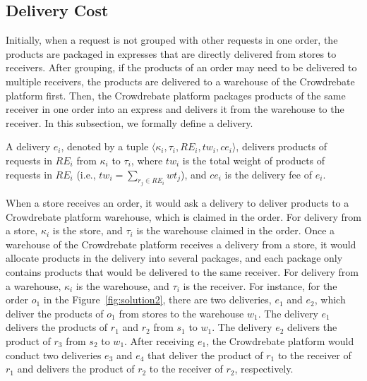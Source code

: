 \subsection{Delivery Cost}
\label{subsec:express}

Initially, when a request is not grouped with other requests in one order, the products are packaged in expresses that are directly delivered from stores to receivers. After grouping, if the products of an order may need to be delivered to multiple receivers, the products are delivered to a warehouse of the Crowdrebate platform first. Then, the Crowdrebate platform packages products of the same receiver in one order into an express and delivers it from the warehouse to the receiver. In this subsection, we formally define a delivery.

\begin{definition}
	\label{def:delivery}
	A delivery $e_i$, denoted by a tuple $\langle \kappa_i, \tau_i, RE_i, tw_i, ce_i\rangle$, delivers products of requests in $RE_i$ from $\kappa_i$ to $\tau_i$, where $tw_i$ is the total weight of products of requests in $RE_i$ (i.e., $tw_i = \sum\limits_{r_j \in RE_i} wt_j$), and $ce_i$ is the delivery fee of $e_i$.
\end{definition}

When a store receives an order, it would ask a delivery to deliver products to a Crowdrebate platform warehouse, which is claimed in the order. For delivery from a store, $\kappa_i$ is the store, and $\tau_i$ is the warehouse claimed in the order. Once a warehouse of the Crowdrebate platform receives a delivery from a store, it would allocate products in the delivery into several packages, and each package only contains products that would be delivered to the same receiver. For delivery from a warehouse, $\kappa_i$ is the warehouse, and $\tau_i$ is the receiver.
For instance, for the order $o_1$ in the Figure~\ref{fig:solution2}, there are two deliveries, $e_1$ and $e_2$, which deliver the products of $o_1$ from stores to the warehouse $w_1$. The delivery $e_1$ delivers the products of $r_1$ and $r_2$ from $s_1$ to $w_1$. The delivery $e_2$ delivers the product of $r_3$ from $s_2$ to $w_1$. After receiving $e_1$, the Crowdrebate platform would conduct two deliveries $e_3$ and $e_4$ that deliver the product of $r_1$ to the receiver of $r_1$ and delivers the product of $r_2$ to the receiver of $r_2$, respectively.

